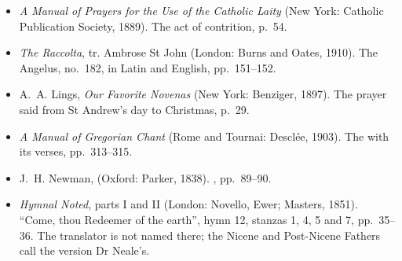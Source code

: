 \begin{itemize}[leftmargin=1.3em, itemsep=0.3em]
\item \textit{A Manual of Prayers for the Use of the Catholic Laity} (New York: Catholic Publication
Society, 1889). The act of contrition, p.~54.
\item \textit{The Raccolta}, tr. Ambrose St John (London: Burns and Oates, 1910). The Angelus,
no.~182, in Latin and English, pp.~151--152.
\item A.~A. Lings, \textit{Our Favorite Novenas} (New York: Benziger, 1897). The prayer said from
St Andrew's day to Christmas, p.~29.
\item \textit{A Manual of Gregorian Chant} (Rome and Tournai: Desclée, 1903). The  with its verses, pp.~313--315.
\item J.~H. Newman,  (Oxford: Parker, 1838). , pp.~89--90.
\item \textit{Hymnal Noted}, parts I and II (London: Novello, Ewer; Masters, 1851). ``Come, thou
Redeemer of the earth'', hymn 12, stanzas 1, 4, 5 and 7, pp.~35--36. The translator is not named
there; the Nicene and Post-Nicene Fathers call the version Dr Neale's.
\end{itemize}
